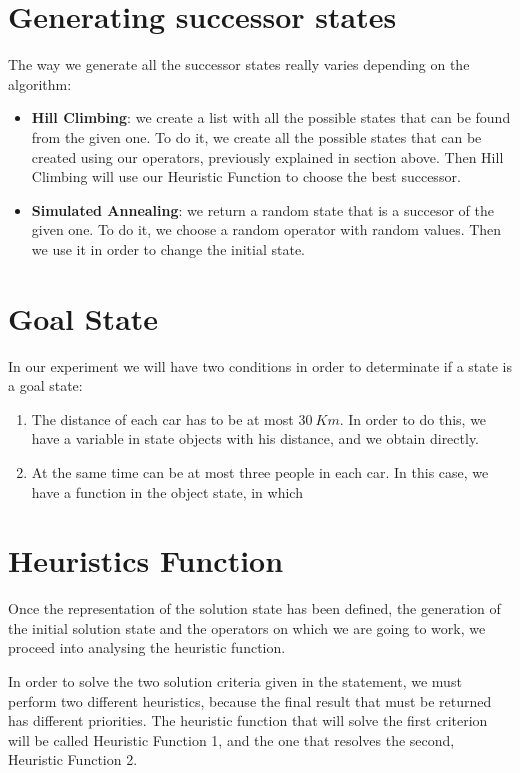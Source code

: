 \documentclass[12]{article}
\begin{document}
\section{Generating successor states}
The way we generate all the successor states really varies depending on the algorithm:
\begin{itemize}
\item \textbf{Hill Climbing}: we create a list with all the possible states that can be found from the given one. To do it, we create all the possible states that can be created using our operators, previously explained in section above. Then Hill Climbing will use our Heuristic Function to choose the best successor.
\item \textbf{Simulated Annealing}: we return a random state that is a succesor of the given one. To do it, we choose a random operator with random values. Then we use it in order to change the initial state.  
\end{itemize}

\section{Goal State}

In our experiment we will have two conditions in order to determinate if a state is a goal state:

\begin{enumerate}
  \item The distance of each car has to be at most $30\ Km$. In order to do this, we have a variable in state objects with his distance, and we obtain directly.
  \item At the same time can be at most three people in each car. In this case, we have a function in the object state, in which 
\end{enumerate}

\section{Heuristics Function}
Once the representation of the solution state has been defined, the generation of the initial solution state and the operators on which we are going to work, we proceed into analysing the heuristic function. 

In order to solve the two solution criteria given in the statement, we must perform two different heuristics, because the final result that must be returned has different priorities. The heuristic function that will solve the first criterion will be called Heuristic Function 1, and the one that resolves the second, Heuristic Function 2. 
\end{document}
